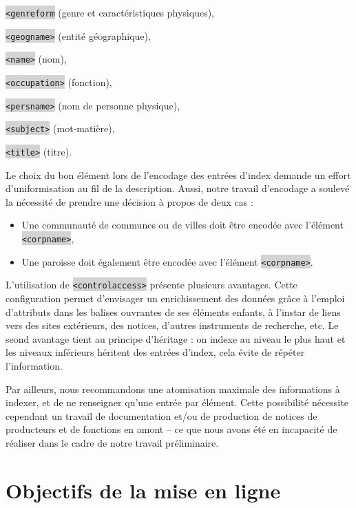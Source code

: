 \documentclass[hidelinks, 13pt]{report}
\newcommand{\code}[1]{\colorbox{LightGray}{\texttt{#1}}}
\begin{document}
	\code{<genreform} (genre et caractéristiques physiques),
	
	\code{<geogname>} (entité géographique),
	
	\code{<name>} (nom),
	
	\code{<occupation>} (fonction),
	
	\code{<persname>} (nom de personne physique),
	
	\code{<subject>} (mot-matière),
	
	\code{<title>} (titre).
	
	Le choix du bon élément lors de l'encodage des entrées d'index demande un effort d'uniformisation au fil de la description. Aussi, notre travail d'encodage a soulevé la nécessité de prendre une décision à propos de deux cas :
	
	\begin{itemize}
		\item Une communauté de communes ou de villes doit être encodée avec l'élément \code{<corpname>},
		\item Une paroisse doit également être encodée avec l'élément \code{<corpname>}.
	\end{itemize}
	
	L'utilisation de \code{<controlaccess>} présente plusieurs avantages. Cette configuration permet d'envisager un enrichissement des données grâce à l'emploi d'attributs dans les balises ouvrantes de ses éléments enfants, à l'instar de liens vers des sites extérieurs, des notices, d'autres instruments de recherche, etc. Le seond avantage tient au principe d'héritage : on indexe au niveau le plus haut et les niveaux inférieurs héritent des entrées d'index, cela évite de répéter l’information. 
	
	Par ailleurs, nous recommandons une atomisation maximale des informations à indexer, et de ne renseigner qu'une entrée par élément.	Cette possibilité nécessite cependant un travail de documentation et/ou de production de notices de producteurs et de fonctions en amont -- ce que nous avons été en incapacité de réaliser dans le cadre de notre travail préliminaire.
	
	
	
	
	
	
	
	
	
	
	\chapter{Objectifs de la mise en ligne}
	
\end{document}
